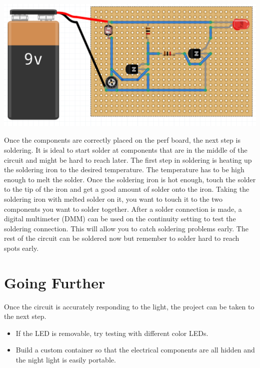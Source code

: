 \documentclass[11pt]{article}
\begin{document}
\centerline{
	\includegraphics[scale=.75]{exp11-circuit}	
}

Once the components are correctly placed on the perf board, the next step is soldering. It is ideal to start solder at components that are in the middle of the circuit and might be hard to reach later. The first step in soldering is heating up the soldering iron to the desired temperature. The temperature has to be high enough to melt the solder. Once the soldering iron is hot enough, touch the solder to the tip of the iron and get a good amount of solder onto the iron. Taking the soldering iron with melted solder on it, you want to touch it to the two components you want to solder together. After a solder connection is made, a digital multimeter (DMM) can be used on the continuity setting to test the soldering connection. This will allow you to catch soldering problems early. The rest of the circuit can be soldered now but remember to solder hard to reach spots early. 

\section{Going Further}
\label{sec-6}
Once the circuit is accurately responding to the light, the project can be taken to the next step. 

\begin{itemize}
	\item If the LED is removable, try testing with different color LEDs.
	
	\item Build a custom container so that the electrical components are all hidden and the night light is easily portable. 
\end{itemize}
\end{document}
